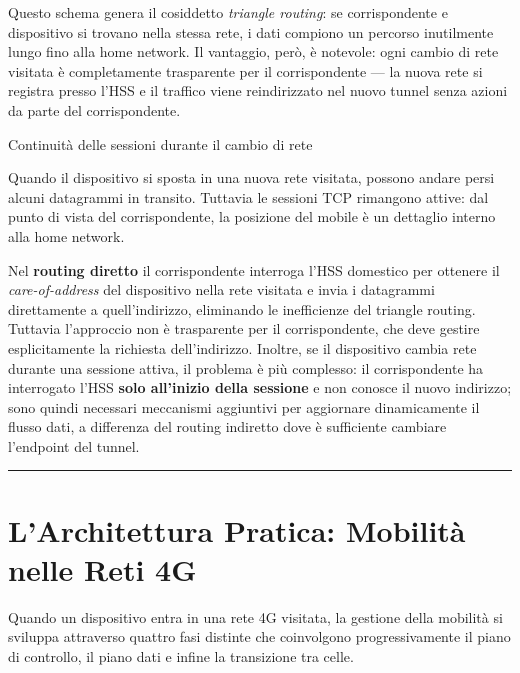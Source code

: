 \documentclass[
  italian,
  openany]{book}
\begin{document}
Questo schema genera il cosiddetto \emph{triangle routing}: se
corrispondente e dispositivo si trovano nella stessa rete, i dati
compiono un percorso inutilmente lungo fino alla home network. Il
vantaggio, però, è notevole: ogni cambio di rete visitata è
completamente trasparente per il corrispondente --- la nuova rete si
registra presso l'HSS e il traffico viene reindirizzato nel nuovo tunnel
senza azioni da parte del corrispondente.

\begin{calloutnote}{Continuità delle sessioni durante il cambio di rete}

Quando il dispositivo si sposta in una nuova rete visitata, possono
andare persi alcuni datagrammi in transito. Tuttavia le sessioni TCP
rimangono attive: dal punto di vista del corrispondente, la posizione
del mobile è un dettaglio interno alla home network.

\end{calloutnote}

Nel \textbf{routing diretto} il corrispondente interroga l'HSS domestico
per ottenere il \emph{care-of-address} del dispositivo nella rete
visitata e invia i datagrammi direttamente a quell'indirizzo, eliminando
le inefficienze del triangle routing. Tuttavia l'approccio non è
trasparente per il corrispondente, che deve gestire esplicitamente la
richiesta dell'indirizzo. Inoltre, se il dispositivo cambia rete durante
una sessione attiva, il problema è più complesso: il corrispondente ha
interrogato l'HSS \textbf{solo all'inizio della sessione} e non conosce
il nuovo indirizzo; sono quindi necessari meccanismi aggiuntivi per
aggiornare dinamicamente il flusso dati, a differenza del routing
indiretto dove è sufficiente cambiare l'endpoint del tunnel.

\begin{center}\rule{0.5\linewidth}{0.5pt}\end{center}

\section{L'Architettura Pratica: Mobilità nelle Reti
4G}\label{larchitettura-pratica-mobilituxe0-nelle-reti-4g}

Quando un dispositivo entra in una rete 4G visitata, la gestione della
mobilità si sviluppa attraverso quattro fasi distinte che coinvolgono
progressivamente il piano di controllo, il piano dati e infine la
transizione tra celle.
\end{document}

